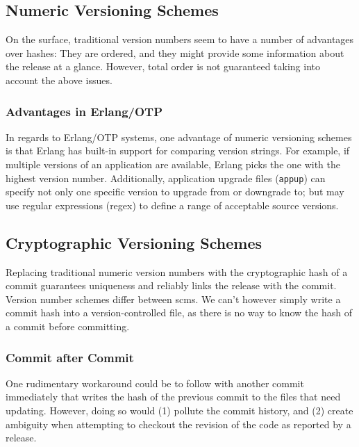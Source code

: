 \subsection{Numeric Versioning Schemes}
On the surface, traditional version numbers seem to have a number of advantages over hashes: They are ordered, and they might provide some information about the release at a glance. However, total order is not guaranteed taking into account the above issues.

\subsubsection{Advantages in Erlang/OTP}
In regards to Erlang/OTP systems, one advantage of numeric versioning schemes is that Erlang has built-in support for comparing version strings. For example, if multiple versions of an application are available, Erlang picks the one with the highest version number. Additionally, application upgrade files (\lstinline|appup|) can specify not only one specific version to upgrade from or downgrade to; but may use regular expressions (regex) to define a range of acceptable source versions.\cite{cesarini:otp}

\subsection{Cryptographic Versioning Schemes}
Replacing traditional numeric version numbers with the cryptographic hash of a commit guarantees uniqueness and reliably links the release with the commit. Version number schemes differ between \acrfull{scm}s. We can't however simply write a commit hash into a version-controlled file, as there is no way to know the hash of a commit before committing.

\subsubsection{Commit after Commit}
One rudimentary workaround could be to follow with another commit immediately that writes the hash of the previous commit to the files that need updating. However, doing so would (1) pollute the commit history, and (2) create ambiguity when attempting to checkout the revision of the code as reported by a release.

